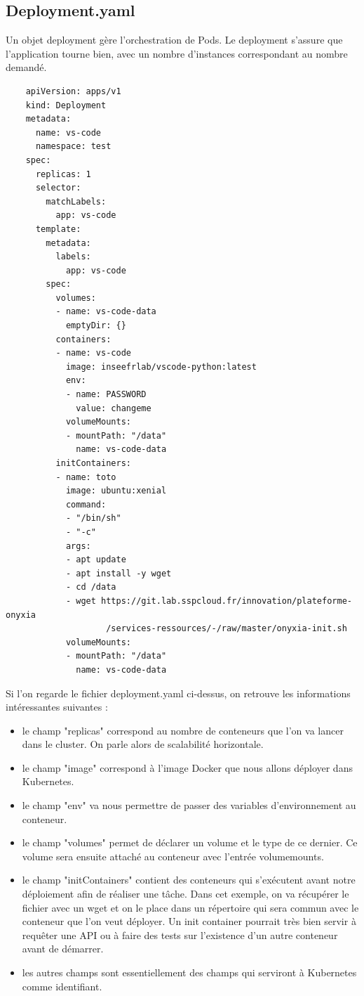 \documentclass[11pt,fleqn]{book} %
\begin{document}
\subsection*{Deployment.yaml}
Un objet deployment gère l'orchestration de Pods. Le deployment s'assure que l'application tourne bien, avec un nombre d'instances correspondant au nombre demandé.
\begin{verbatim}
    apiVersion: apps/v1
    kind: Deployment
    metadata:
      name: vs-code
      namespace: test
    spec:
      replicas: 1
      selector:
        matchLabels:
          app: vs-code
      template:
        metadata:
          labels:
            app: vs-code
        spec:
          volumes:
          - name: vs-code-data
            emptyDir: {}
          containers:
          - name: vs-code
            image: inseefrlab/vscode-python:latest
            env:
            - name: PASSWORD
              value: changeme
            volumeMounts:
            - mountPath: "/data"
              name: vs-code-data
          initContainers:
          - name: toto
            image: ubuntu:xenial
            command:
            - "/bin/sh"
            - "-c"
            args:
            - apt update
            - apt install -y wget
            - cd /data
            - wget https://git.lab.sspcloud.fr/innovation/plateforme-onyxia
                    /services-ressources/-/raw/master/onyxia-init.sh
            volumeMounts:
            - mountPath: "/data"
              name: vs-code-data
\end{verbatim}

Si l'on regarde le fichier deployment.yaml ci-dessus, on retrouve les informations intéressantes suivantes : 
\begin{itemize}
    \item le champ "replicas" correspond au nombre de conteneurs que l'on va lancer dans le cluster. On parle alors de scalabilité horizontale. 
    \item le champ "image" correspond à l'image Docker que nous allons déployer dans Kubernetes.
    \item le champ "env" va nous permettre de passer des variables d'environnement au conteneur.
    \item le champ "volumes" permet de déclarer un volume et le type de ce dernier. Ce volume sera ensuite attaché au conteneur avec l'entrée volumemounts.
    \item le champ "initContainers" contient des conteneurs qui s'exécutent avant notre déploiement afin de réaliser une tâche. Dans cet exemple, on va récupérer le fichier avec un wget et on le place dans un répertoire qui sera commun avec le conteneur que l'on veut déployer. Un init container pourrait très bien servir à requêter une API ou à faire des tests sur l'existence d'un autre conteneur avant de démarrer.
    \item les autres champs sont essentiellement des champs qui serviront à Kubernetes comme identifiant.\\
\end{itemize}
\end{document}
